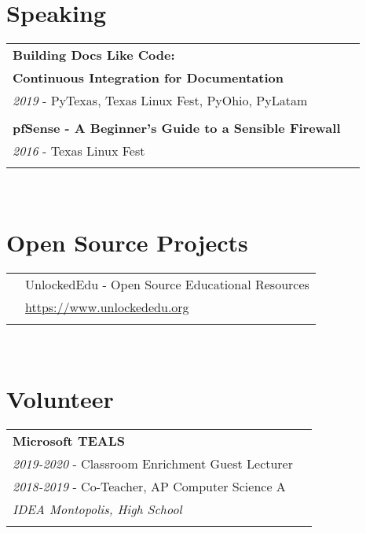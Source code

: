 \documentclass[10pt]{article} %
\newcommand\tab[1][1cm]{\hspace*{#1}}
\begin{document}
\begin{minipage}[t]{0.44\textwidth}
\section{Speaking} 

\begin{tabular}{ll}
\textbf{Building Docs Like Code:} \\
\tab\textbf{Continuous Integration for Documentation}\\
\textit{2019} - PyTexas, Texas Linux Fest, PyOhio, PyLatam\\
\\


\textbf{pfSense - A Beginner's Guide to a Sensible Firewall} \\
\textit{2016} - Texas Linux Fest\\
\\
\end{tabular}\\

\section{Open Source Projects}

\begin{tabular}{rl}
& UnlockedEdu - Open Source Educational Resources\\
& \quad \href{https://www.unlockededu.org}{https://www.unlockededu.org} \\
\\
\end{tabular}\\


\section{Volunteer} 

\begin{tabular}{ll}
\textbf{Microsoft TEALS}\\
\tab\textit{2019-2020} - Classroom Enrichment Guest Lecturer\\
\tab\textit{2018-2019} - Co-Teacher, AP Computer Science A\\
\tab\tab\textit {IDEA Montopolis, High School}\\
\\


\end{tabular}
\end{minipage}
\end{document}
